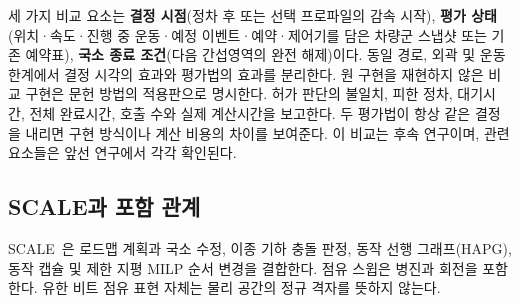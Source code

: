 \documentclass[11pt,a4paper]{article}
\theoremstyle{remark}
\begin{document}
세 가지 비교 요소는 \textbf{결정 시점}(정차 후 또는 선택 프로파일의 감속 시작), \textbf{평가 상태}(위치·속도·진행 중 운동·예정 이벤트·예약·제어기를 담은 차량군 스냅샷 또는 기존 예약표), \textbf{국소 종료 조건}(다음 간섭영역의 완전 해제)이다. 동일 경로, 외곽 및 운동 한계에서 결정 시각의 효과와 평가법의 효과를 분리한다. 원 구현을 재현하지 않은 비교 구현은 문헌 방법의 적용판으로 명시한다. 허가 판단의 불일치, 피한 정차, 대기시간, 전체 완료시간, 호출 수와 실제 계산시간을 보고한다. 두 평가법이 항상 같은 결정을 내리면 구현 방식이나 계산 비용의 차이를 보여준다. 이 비교는 후속 연구이며, 관련 요소들은 앞선 연구에서 각각 확인된다.

\subsection{SCALE과 포함 관계}
SCALE~\cite{scale2026}은 로드맵 계획과 국소 수정, 이종 기하 충돌 판정, 동작 선행 그래프(HAPG), 동작 캡슐 및 제한 지평 MILP 순서 변경을 결합한다. 점유 스윕은 병진과 회전을 포함한다. 유한 비트 점유 표현 자체는 물리 공간의 정규 격자를 뜻하지 않는다.
\end{document}
